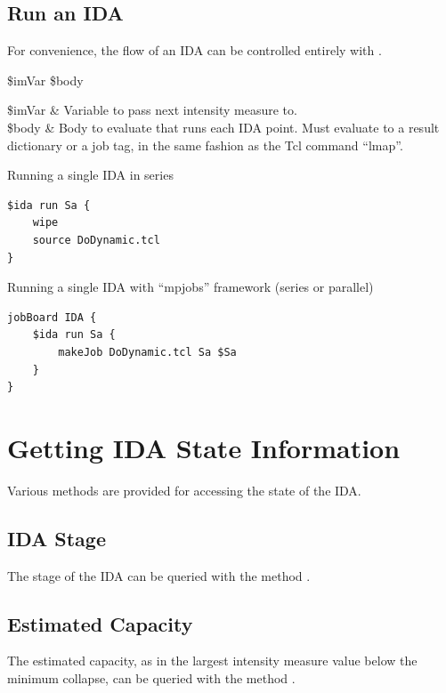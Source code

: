 \documentclass{article}
\renewcommand{\^}[1]{\textsuperscript{#1}}
\renewcommand{\_}[1]{\textsubscript{#1}}
\begin{document}
\subsection{Run an IDA}
For convenience, the flow of an IDA can be controlled entirely with .
\begin{syntax}
 \$imVar \$body
\end{syntax}
\begin{args}
\$imVar & Variable to pass next intensity measure to. \\
\$body & Body to evaluate that runs each IDA point. Must evaluate to a result dictionary or a job tag, in the same fashion as the Tcl command ``lmap''.
\end{args}

\begin{example}{Running a single IDA in series}
\begin{lstlisting}
$ida run Sa {
    wipe
    source DoDynamic.tcl
}
\end{lstlisting}
\end{example}
\begin{example}{Running a single IDA with ``mpjobs'' framework (series or parallel)}
\begin{lstlisting}
jobBoard IDA {
    $ida run Sa {
    	makeJob DoDynamic.tcl Sa $Sa
    }
}
\end{lstlisting}
\end{example}

\clearpage
\section{Getting IDA State Information}
Various methods are provided for accessing the state of the IDA.
\subsection{IDA Stage}
The stage of the IDA can be queried with the method .
\begin{syntax}
\end{syntax}
\subsection{Estimated Capacity}
The estimated capacity, as in the largest intensity measure value below the minimum collapse, can be queried with the method .
\begin{syntax}
\end{syntax}
\end{document}
